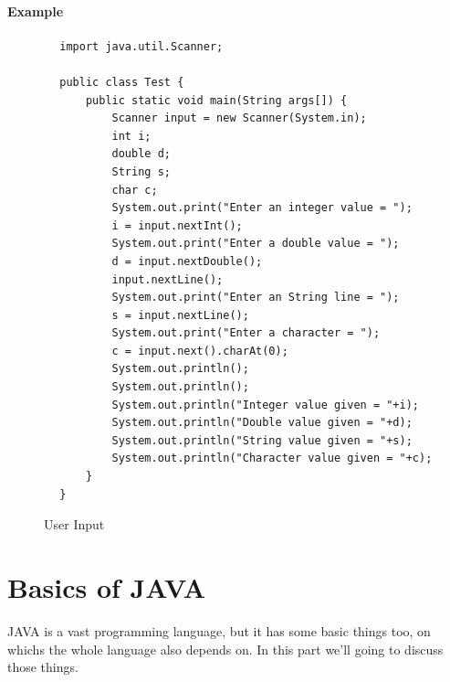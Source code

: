 \documentclass[A4 paper,openany]{book}  %
\begin{document}
\subsection{Example}
\begin{center}
    \begin{verbatim}
        import java.util.Scanner;

        public class Test {
            public static void main(String args[]) {
                Scanner input = new Scanner(System.in);
                int i;
                double d;
                String s;
                char c;
                System.out.print("Enter an integer value = ");
                i = input.nextInt();
                System.out.print("Enter a double value = ");
                d = input.nextDouble();
                input.nextLine();
                System.out.print("Enter an String line = ");
                s = input.nextLine();
                System.out.print("Enter a character = ");
                c = input.next().charAt(0);
                System.out.println();
                System.out.println();
                System.out.println("Integer value given = "+i);
                System.out.println("Double value given = "+d);
                System.out.println("String value given = "+s);
                System.out.println("Character value given = "+c);
            }
        }
    \end{verbatim}
\end{center}
% 
% 
\begin{figure}[htbp]
    \begin{center}
        \caption{User Input\cite{Ref7}\cite{Ref3}}
    \end{center}
\end{figure}

% 
% 
\part{Basics of JAVA}
JAVA is a vast programming language, but it has some basic things too, on
whichs the whole language also depends on. In this part we'll going to discuss those things.
% 
% 
\end{document}
